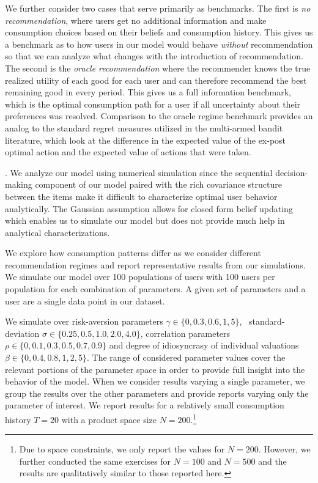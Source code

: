 \documentclass[manuscript]{acmart}
\newcommand{\xhdr}[1]{\vspace{1mm} \noindent{\bf #1}}
\begin{document}
We further consider two cases that serve primarily as benchmarks. The first is \textit{no recommendation}, where users get no additional information and make consumption choices based on their beliefs and consumption history. This gives us a benchmark as to how users in our model would behave \textit{without} recommendation so that we can analyze what changes with the introduction of recommendation. The second is the \textit{oracle recommendation} where the recommender knows the true realized utility of each good for each user and can therefore recommend the best remaining good in every period. This gives us a full information benchmark, which is the optimal consumption path for a user if all uncertainty about their preferences was resolved. Comparison to the oracle regime benchmark provides an analog to the standard regret measures utilized in the multi-armed bandit literature, which look at the difference in the expected value of the ex-post optimal action and the expected value of actions that were taken.
\par

\xhdr{Simulation Details}. 
We analyze our model using numerical simulation since the sequential decision-making component of our model paired with the rich covariance structure between the items make it difficult to characterize optimal user behavior analytically. The Gaussian assumption allows for closed form belief updating which enables us to simulate our model but does not provide much help in analytical characterizations. 
\par

We explore how consumption patterns differ as we consider different recommendation regimes and report representative results from our simulations. We simulate our model over 100 populations of users with 100 users per population for each combination of parameters. 
A given set of parameters and a user are a single data point in our dataset.
\par

We simulate over risk-aversion parameters $\gamma \in \{ 0, 0.3, 0.6, 1, 5 \}$, \ standard-deviation $\sigma \in \{ 0.25, 0.5, 1.0, 2.0, 4.0 \}$, correlation parameters $\rho\in \{ 0, 0.1, 0.3, 0.5, 0.7, 0.9 \} $ and degree of idiosyncrasy of individual valuations $\beta \in \{ 0, 0.4, 0.8, 1, 2, 5\}$. The range of considered parameter values cover the relevant portions of the parameter space in order to provide full insight into the behavior of the model. When we consider results varying a single parameter, we group the results over the other parameters and provide reports varying only the parameter of interest. We report results for a relatively small consumption history $T=20$ with a product space size $N=200$.\footnote{Due to space constraints, we only report the values for $N = 200$. However, we further conducted the same exercises for $N = 100$ and $N = 500$ and the results are qualitatively similar to those reported here.}
\end{document}
